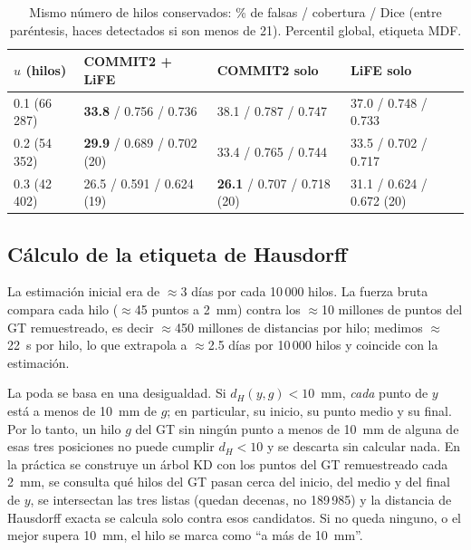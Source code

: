 \documentclass[11pt,a4paper]{article}
\begin{document}
\begin{table}[H]
\centering
\small
\begin{tabularx}{\textwidth}{@{}lXXX@{}}
\toprule
\textbf{$u$ (hilos)} & \textbf{COMMIT2 + LiFE} & \textbf{COMMIT2 solo} & \textbf{LiFE solo}\\
\midrule
0.1 (66\,287) & \textbf{33.8} / 0.756 / 0.736 & 38.1 / 0.787 / 0.747 & 37.0 / 0.748 / 0.733\\
0.2 (54\,352) & \textbf{29.9} / 0.689 / 0.702 (20) & 33.4 / 0.765 / 0.744 & 33.5 / 0.702 / 0.717\\
0.3 (42\,402) & 26.5 / 0.591 / 0.624 (19) & \textbf{26.1} / 0.707 / 0.718 (20) & 31.1 / 0.624 / 0.672 (20)\\
\bottomrule
\end{tabularx}
\caption{Mismo n\'umero de hilos conservados: \% de falsas / cobertura / Dice (entre
par\'entesis, haces detectados si son menos de 21). Percentil global, etiqueta MDF.}
\label{tab:mismon}
\end{table}

\subsection{C\'alculo de la etiqueta de Hausdorff}
\label{sec:haus}

La estimaci\'on inicial era de $\approx$3 d\'ias por cada 10\,000 hilos. La fuerza bruta
compara cada hilo ($\approx$45 puntos a 2~mm) contra los $\approx$10 millones de puntos del
GT remuestreado, es decir $\approx$450 millones de distancias por hilo; medimos $\approx$22~s
por hilo, lo que extrapola a $\approx$2.5 d\'ias por 10\,000 hilos y coincide con la
estimaci\'on.

La poda se basa en una desigualdad. Si $d_H(y,g)<10$~mm, \emph{cada} punto de $y$ est\'a a
menos de 10~mm de $g$; en particular, su inicio, su punto medio y su final. Por lo tanto,
un hilo $g$ del GT sin ning\'un punto a menos de 10~mm de alguna de esas tres posiciones no
puede cumplir $d_H<10$ y se descarta sin calcular nada. En la pr\'actica se construye un
\'arbol KD con los puntos del GT remuestreado cada 2~mm, se consulta qu\'e hilos del GT pasan
cerca del inicio, del medio y del final de $y$, se intersectan las tres listas (quedan
decenas, no 189\,985) y la distancia de Hausdorff exacta se calcula solo contra esos
candidatos. Si no queda ninguno, o el mejor supera 10~mm, el hilo se marca como
``a m\'as de 10~mm''.
\end{document}
